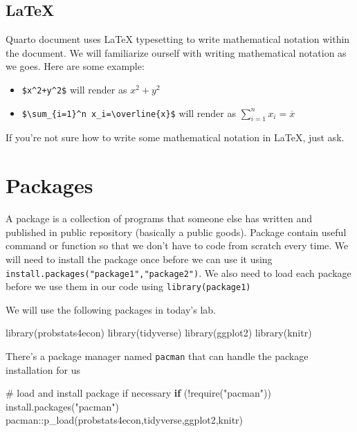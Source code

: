 \documentclass[
  letterpaper,
  DIV=11,
  numbers=noendperiod]{scrartcl}
\newenvironment{Shaded}{\begin{snugshade}}{\end{snugshade}}
\newcommand{\CommentTok}[1]{\textcolor[rgb]{0.37,0.37,0.37}{#1}}
\newcommand{\ControlFlowTok}[1]{\textcolor[rgb]{0.00,0.23,0.31}{\textbf{#1}}}
\newcommand{\FunctionTok}[1]{\textcolor[rgb]{0.28,0.35,0.67}{#1}}
\newcommand{\NormalTok}[1]{\textcolor[rgb]{0.00,0.23,0.31}{#1}}
\newcommand{\SpecialCharTok}[1]{\textcolor[rgb]{0.37,0.37,0.37}{#1}}
\newcommand{\StringTok}[1]{\textcolor[rgb]{0.13,0.47,0.30}{#1}}
\providecommand{\tightlist}{%
  \setlength{\itemsep}{0pt}\setlength{\parskip}{0pt}}\usepackage{longtable,booktabs,array}
\begin{document}
\subsection{LaTeX}\label{latex}

Quarto document uses LaTeX typesetting to write mathematical notation
within the document. We will familiarize ourself with writing
mathematical notation as we goes. Here are some example:

\begin{itemize}
\tightlist
\item
  \texttt{\$x\^{}2+y\^{}2\$} will render as \(x^2+y^2\)
\item
  \texttt{\$\textbackslash{}sum\_\{i=1\}\^{}n\ x\_i=\textbackslash{}overline\{x\}\$}
  will render as \(\sum_{i=1}^n x_i=\overline{x}\)
\end{itemize}

If you're not sure how to write some mathematical notation in LaTeX,
just ask.

\section{Packages}\label{packages}

A package is a collection of programs that someone else has written and
published in public repository (basically a public goods). Package
contain useful command or function so that we don't have to code from
scratch every time. We will need to install the package once before we
can use it using \texttt{install.packages("package1","package2")}. We
also need to load each package before we use them in our code using
\texttt{library(package1)}

We will use the following packages in today's lab.

\begin{Shaded}
\begin{Highlighting}[]
\FunctionTok{library}\NormalTok{(probstats4econ)}
\FunctionTok{library}\NormalTok{(tidyverse)}
\FunctionTok{library}\NormalTok{(ggplot2)}
\FunctionTok{library}\NormalTok{(knitr)}
\end{Highlighting}
\end{Shaded}

There's a package manager named \texttt{pacman} that can handle the
package installation for us

\begin{Shaded}
\begin{Highlighting}[]
\CommentTok{\# load and install package if necessary}
\ControlFlowTok{if}\NormalTok{ (}\SpecialCharTok{!}\FunctionTok{require}\NormalTok{(}\StringTok{"pacman"}\NormalTok{)) }\FunctionTok{install.packages}\NormalTok{(}\StringTok{"pacman"}\NormalTok{)}
\NormalTok{pacman}\SpecialCharTok{::}\FunctionTok{p\_load}\NormalTok{(probstats4econ,tidyverse,ggplot2,knitr)}
\end{Highlighting}
\end{Shaded}
\end{document}
